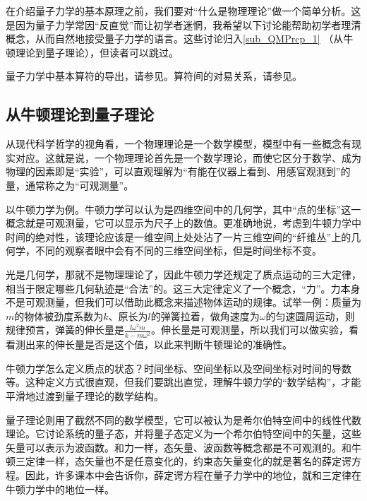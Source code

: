 

在介绍量子力学的基本原理之前，我们要对“什么是物理理论”做一个简单分析。这是因为量子力学常因“反直觉”而让初学者迷惘，我希望以下讨论能帮助初学者理清概念，从而自然地接受量子力学的语言。这些讨论归入\autoref{sub_QMPrcp_1} （从牛顿理论到量子理论），但读者可以跳过。


量子力学中基本算符的导出，请参见。算符间的对易关系，请参见。

\subsection{从牛顿理论到量子理论}\label{sub_QMPrcp_1}

从现代科学哲学的视角看，一个物理理论是一个数学模型，模型中有一些概念有现实对应。这就是说，一个物理理论首先是一个数学理论，而使它区分于数学、成为物理的因素即是“实验”，可以直观理解为“有能在仪器上看到、用感官观测到”的量，通常称之为“可观测量”。

以牛顿力学为例。牛顿力学可以认为是四维空间中的几何学，其中“点的坐标”这一概念就是可观测量，它可以显示为尺子上的数值。更准确地说，考虑到牛顿力学中时间的绝对性，该理论应该是一维空间上处处沾了一片三维空间的“纤维丛”上的几何学，不同的观察者眼中会有不同的三维空间坐标，但是时间坐标不变。

光是几何学，那就不是物理理论了，因此牛顿力学还规定了质点运动的三大定律，相当于限定哪些几何轨迹是“合法”的。这三大定律定义了一个概念，“力”。力本身不是可观测量，但我们可以借助此概念来描述物体运动的规律。试举一例：质量为$m$的物体被劲度系数为$k$、原长为$l$的弹簧拉着，做角速度为$\omega$的匀速圆周运动，则规律预言，弹簧的伸长量是$\frac{l\omega^2m}{k-m\omega^2}$。伸长量是可观测量，所以我们可以做实验，看看测出来的伸长量是否是这个值，以此来判断牛顿理论的准确性。

牛顿力学怎么定义质点的状态？时间坐标、空间坐标以及空间坐标对时间的导数等。这种定义方式很直观，但我们要跳出直觉，理解牛顿力学的“数学结构”，才能平滑地过渡到量子理论的数学结构。

量子理论则用了截然不同的数学模型，它可以被认为是希尔伯特空间中的线性代数理论。它讨论系统的量子态，并将量子态定义为一个希尔伯特空间中的矢量，这些矢量可以表示为波函数。和力一样，态矢量、波函数等概念都是不可观测的。和牛顿三定律一样，态矢量也不是任意变化的，约束态矢量变化的就是著名的薛定谔方程。因此，许多课本中会告诉你，薛定谔方程在量子力学中的地位，就和三定律在牛顿力学中的地位一样。

